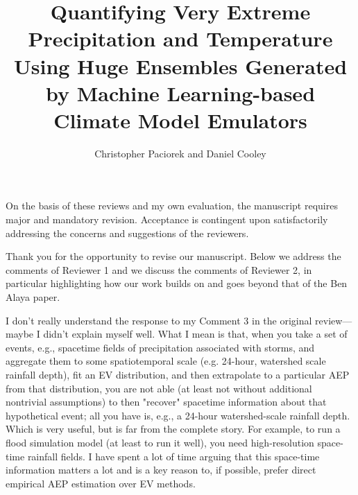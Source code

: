 \documentclass[12pt,english]{reviewresponse}
\title{Quantifying Very Extreme Precipitation and Temperature Using Huge Ensembles Generated by Machine Learning-based Climate Model Emulators}
\author{Christopher Paciorek and Daniel Cooley}
\begin{document}
\maketitle

\editor
\begin{generalcomment}
	On the basis of these reviews and my own evaluation, the manuscript requires major and mandatory revision. Acceptance is contingent upon satisfactorily addressing the concerns and suggestions of the reviewers.
\end{generalcomment}
\begin{revresponse}

Thank you for the opportunity to revise our manuscript. Below we address the comments of Reviewer 1 and we discuss the comments of Reviewer 2, in particular highlighting how our work builds on and goes beyond that of the Ben Alaya paper.

 


\end{revresponse}

\reviewer 

\begin{revcomment}
   I don't really understand the response to my Comment 3 in the original review—maybe I didn't explain myself well. What I mean is that, when you take a set of events, e.g., spacetime fields of precipitation associated with storms, and aggregate them to some spatiotemporal scale (e.g. 24-hour, watershed scale rainfall depth), fit an EV distribution, and then extrapolate to a particular AEP from that distribution, you are not able (at least not without additional nontrivial assumptions) to then "recover" spacetime information about that hypothetical event; all you have is, e.g., a 24-hour watershed-scale rainfall depth. Which is very useful, but is far from the complete story. For example, to run a flood simulation model (at least to run it well), you need high-resolution space-time rainfall fields. I have spent a lot of time arguing that this space-time information matters a lot and is a key reason to, if possible, prefer direct empirical AEP estimation over EV methods.
\end{revcomment}
\end{document}
